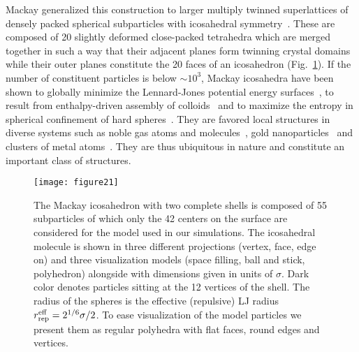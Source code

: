 \documentclass[10pt,aps,pre,twocolumn,superscriptaddress,amsmath,amssymb]{revtex4-1}
\begin{document}
Mackay generalized this construction to larger multiply twinned superlattices of densely packed spherical subparticles with icosahedral symmetry~\cite{Mackay1962}. These are composed of 20 slightly deformed close-packed tetrahedra which are merged together in such a way that their adjacent planes form twinning crystal domains while their outer planes constitute the 20 faces of an icosahedron (Fig.~\ref{fig:model}).
If the number of constituent particles is below $\sim10^3$, Mackay icosahedra have been shown to globally minimize the Lennard-Jones potential energy surfaces~\cite{Wales2013}, to result from enthalpy-driven assembly of colloids~\cite{Rupich2009} and to maximize the entropy in spherical confinement of hard spheres~\cite{DeNijs2015}.
They are favored local structures in diverse systems such as noble gas atoms and molecules~\cite{Farges1986}, gold nanoparticles~\cite{Lacava2012} and clusters of metal atoms~\cite{Kuo2002}. 
They are thus ubiquitous in nature and constitute an important class of structures.

\begin{figure}
  \centering
  \texttt{[image: figure21]}
  \caption{The Mackay icosahedron with two complete shells is composed of 55 subparticles of which only the 42 centers on the surface are considered for the model used in our simulations. The icosahedral molecule is shown in three different projections (vertex, face, edge on) and three visualization models (space filling, ball and stick, polyhedron) alongside with dimensions given in units of $\sigma$. Dark color denotes particles sitting at the 12 vertices of the shell. The radius of the spheres is the effective (repulsive) LJ radius $r_{\rm rep}^{\rm eff}=2^{1/6}\sigma/2$. To ease visualization of the model particles we present them as regular polyhedra with flat faces, round edges and vertices.
  }
  \label{fig:model}
\end{figure}
\end{document}
